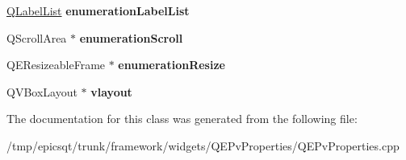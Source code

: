 \begin{DoxyCompactItemize}
\item 
\hypertarget{classQEPvProperties_1_1OwnWidgets_aa15a994836c1365fabee4a946b9f2213}{
\hyperlink{classQLabelList}{QLabelList} {\bfseries enumerationLabelList}}
\label{classQEPvProperties_1_1OwnWidgets_aa15a994836c1365fabee4a946b9f2213}

\item 
\hypertarget{classQEPvProperties_1_1OwnWidgets_a57eddf3bc725bbb54bbca2f18dc398d0}{
QScrollArea $\ast$ {\bfseries enumerationScroll}}
\label{classQEPvProperties_1_1OwnWidgets_a57eddf3bc725bbb54bbca2f18dc398d0}

\item 
\hypertarget{classQEPvProperties_1_1OwnWidgets_a4dd09384598daee724bf518fbe2acad9}{
QEResizeableFrame $\ast$ {\bfseries enumerationResize}}
\label{classQEPvProperties_1_1OwnWidgets_a4dd09384598daee724bf518fbe2acad9}

\item 
\hypertarget{classQEPvProperties_1_1OwnWidgets_aa538b1ebed199f7e062ededdb85baedb}{
QVBoxLayout $\ast$ {\bfseries vlayout}}
\label{classQEPvProperties_1_1OwnWidgets_aa538b1ebed199f7e062ededdb85baedb}

\end{DoxyCompactItemize}


The documentation for this class was generated from the following file:\begin{DoxyCompactItemize}
\item 
/tmp/epicsqt/trunk/framework/widgets/QEPvProperties/QEPvProperties.cpp\end{DoxyCompactItemize}
